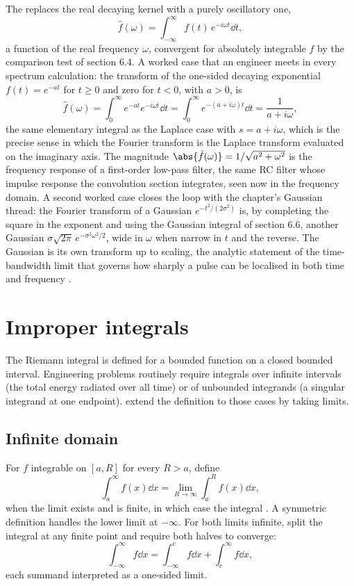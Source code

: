 The  replaces the real decaying kernel with
a purely oscillatory one,
\[
\hat{f}(\omega) = \int_{-\infty}^{\infty} f(t)\,e^{-i\omega t}\dd t,
\]
a function of the real frequency $\omega$, convergent for absolutely
integrable $f$ by the comparison test of section 6.4. A worked case
that an engineer meets in every spectrum calculation: the transform of
the one-sided decaying exponential $f(t) = e^{-at}$ for $t \geq 0$ and
zero for $t < 0$, with $a > 0$, is
\[
\hat{f}(\omega) = \int_{0}^{\infty} e^{-at}e^{-i\omega t}\dd t =
\int_{0}^{\infty} e^{-(a + i\omega)t}\dd t = \frac{1}{a + i\omega},
\]
the same elementary integral as the Laplace case with $s = a +
i\omega$, which is the precise sense in which the Fourier transform is
the Laplace transform evaluated on the imaginary axis. The magnitude
$\abs{\hat{f}(\omega)} = 1/\sqrt{a^{2} + \omega^{2}}$ is the frequency
response of a first-order low-pass filter, the same RC filter whose
impulse response the convolution section integrates, seen now in the
frequency domain. A second worked case closes the loop with the
chapter's Gaussian thread: the Fourier transform of a Gaussian
$e^{-t^{2}/(2\sigma^{2})}$ is, by completing the square in the exponent
and using the Gaussian integral of section 6.6, another Gaussian
$\sigma\sqrt{2\pi}\,e^{-\sigma^{2}\omega^{2}/2}$, wide in $\omega$ when
narrow in $t$ and the reverse. The Gaussian is its own transform up to
scaling, the analytic statement of the time-bandwidth limit that
governs how sharply a pulse can be localised in both time and
frequency \cite{text:ch06-oppenheim-schafer-2010}.

\section{Improper integrals}

The Riemann integral is defined for a bounded function on a closed
bounded interval. Engineering problems routinely require integrals
over infinite intervals (the total energy radiated over all time)
or of unbounded integrands (a singular integrand at one endpoint).
 extend the definition to those cases by
taking limits.

\subsection{Infinite domain}

For $f$ integrable on $[a, R]$ for every $R > a$, define
\[
\int_{a}^{\infty} f(x) \dd x = \lim_{R \to \infty}
\int_{a}^{R} f(x) \dd x,
\]
when the limit exists and is finite, in which case the integral
. A symmetric definition handles the lower limit
at $-\infty$. For both limits infinite, split the integral at any
finite point and require both halves to converge:
\[
\int_{-\infty}^{\infty} f \dd x =
\int_{-\infty}^{c} f \dd x + \int_{c}^{\infty} f \dd x,
\]
each summand interpreted as a one-sided limit.

